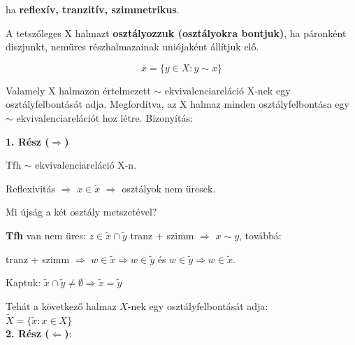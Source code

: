 \begin{frame}
\begin{tcolorbox}[title={Def.: Ekvivalenciareláció}]
ha \textbf{reflexív, tranzitív, szimmetrikus}.
\end{tcolorbox}

\begin{tcolorbox}[title={Def.: Halmaz osztályfelbontása}]
A tetszőleges X halmazt \textbf{osztályozzuk (osztályokra bontjuk)}, ha páronként diszjunkt, nemüres részhalmazainak uniójaként állítjuk elő.
\end{tcolorbox}

\begin{tcolorbox}[title={Az x $\in$ X elem \textbf{ekvivalencia osztálya}:}]
$$\overline{x} = \{y \in X : y \sim x\}$$
\end{tcolorbox}

\begin{tcolorbox}[title={Tétel: Ekvivalenciareláció és osztályfelbontás kapcsolata}]
Valamely X halmazon értelmezett $\sim$ ekvivalenciareláció X-nek egy osztályfelbontását adja. Megfordítva, az X halmaz minden osztályfelbontása egy $\sim$ ekvivalenciarelációt hoz létre.
\tcblower
Bizonyítás:\\
\mmedskip

\textbf{1. Rész ($\Rightarrow$)}\\
\mmedskip

Tfh $\sim$ ekvivalenciareláció X-n.
\msmallskip

Reflexivitás $\Rightarrow$ $x \in \tilde{x}$ $\Rightarrow$ osztályok nem üresek.\\
\msmallskip

Mi újság a két osztály metszetével?\\
\msmallskip

\textbf{Tfh} van nem üres: $z \in \tilde{x} \cap \tilde{y}$ tranz + szimm $\Rightarrow$ $x \sim y$, továbbá:\\
\msmallskip

tranz + szimm $\Rightarrow$ $w \in \tilde{x} \Rightarrow w \in \tilde{y}$ és $w \in \tilde{y} \Rightarrow w \in \tilde{x}$.
\msmallskip

Kaptuk: $\tilde{x} \cap \tilde{y} \neq \emptyset \Rightarrow \tilde{x} = \tilde{y}$
\mmedskip

Tehát a következő halmaz $X$-nek egy osztályfelbontását adja:\\
$\tilde{X} = \{ \tilde{x} : x \in X \}$\\

\textbf{2. Rész ($\Leftarrow$)}:\\
\mmedskip


\end{tcolorbox}
\end{frame}
